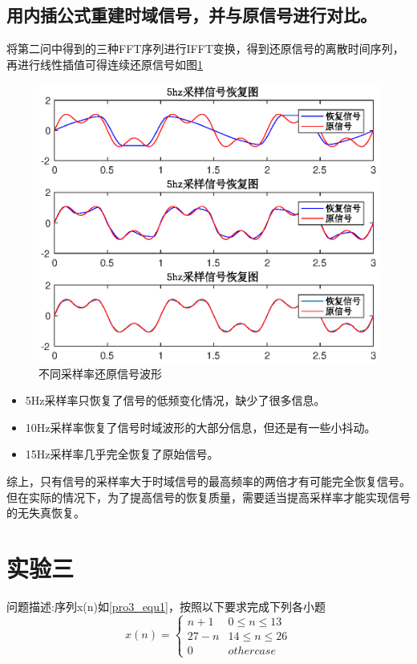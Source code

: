 \documentclass[UTF8]{article}
\begin{document}
\begin{CJK}{UTF8}{gkai}
\subsection{用内插公式重建时域信号，并与原信号进行对比。}
将第二问中得到的三种FFT序列进行IFFT变换，得到还原信号的离散时间序列，再进行线性插值可得连续还原信号如图\ref{pro2_fig3}
\begin{figure}
  \centering
  \includegraphics[scale=0.6]{pro2_subpro3.eps}
  \caption{不同采样率还原信号波形}
  \label{pro2_fig3}
\end{figure}
\begin{itemize}
  \item 5Hz采样率只恢复了信号的低频变化情况，缺少了很多信息。
  \item 10Hz采样率恢复了信号时域波形的大部分信息，但还是有一些小抖动。
  \item 15Hz采样率几乎完全恢复了原始信号。
\end{itemize}
综上，只有信号的采样率大于时域信号的最高频率的两倍才有可能完全恢复信号。但在实际的情况下，为了提高信号的恢复质量，需要适当提高采样率才能实现信号的无失真恢复。

\section{实验三}
问题描述:序列x(n)如\ref{pro3_equ1}，按照以下要求完成下列各小题
\begin{equation}
  x(n)=\left\{
  \begin{array}{cc}
    n+1 & 0\leq n\leq13\\
    27-n & 14\leq n\leq26\\
    0 & other case
  \end{array}
  \right.
  \label{pro3_equ1}
\end{equation}

\end{CJK}
\end{document}
